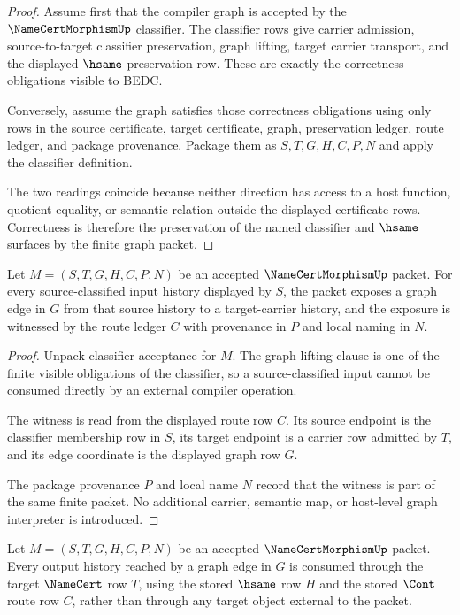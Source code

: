\begin{proof}
Assume first that the compiler graph is accepted by the $\NameCertMorphismUp$ classifier. The classifier rows give carrier admission, source-to-target classifier preservation, graph lifting, target carrier transport, and the displayed $\hsame$ preservation row. These are exactly the correctness obligations visible to BEDC.

Conversely, assume the graph satisfies those correctness obligations using only rows in the source certificate, target certificate, graph, preservation ledger, route ledger, and package provenance. Package them as $S,T,G,H,C,P,N$ and apply the classifier definition.

The two readings coincide because neither direction has access to a host function, quotient equality, or semantic relation outside the displayed certificate rows. Correctness is therefore the preservation of the named classifier and $\hsame$ surfaces by the finite graph packet.
\end{proof}

\begin{theorem}
\label{thm:namecert-morphism-graph-lifting-obligation}
Let $M=(S,T,G,H,C,P,N)$ be an accepted $\NameCertMorphismUp$ packet. For every source-classified input history displayed by $S$, the packet exposes a graph edge in $G$ from that source history to a target-carrier history, and the exposure is witnessed by the route ledger $C$ with provenance in $P$ and local naming in $N$.
\end{theorem}

\begin{proof}
Unpack classifier acceptance for $M$. The graph-lifting clause is one of the finite visible obligations of the classifier, so a source-classified input cannot be consumed directly by an external compiler operation.

The witness is read from the displayed route row $C$. Its source endpoint is the classifier membership row in $S$, its target endpoint is a carrier row admitted by $T$, and its edge coordinate is the displayed graph row $G$.

The package provenance $P$ and local name $N$ record that the witness is part of the same finite packet. No additional carrier, semantic map, or host-level graph interpreter is introduced.
\end{proof}

\begin{theorem}
\label{thm:namecert-morphism-target-transport-obligation}
Let $M=(S,T,G,H,C,P,N)$ be an accepted $\NameCertMorphismUp$ packet. Every output history reached by a graph edge in $G$ is consumed through the target $\NameCert$ row $T$, using the stored $\hsame$ row $H$ and the stored $\Cont$ route row $C$, rather than through any target object external to the packet.
\end{theorem}

